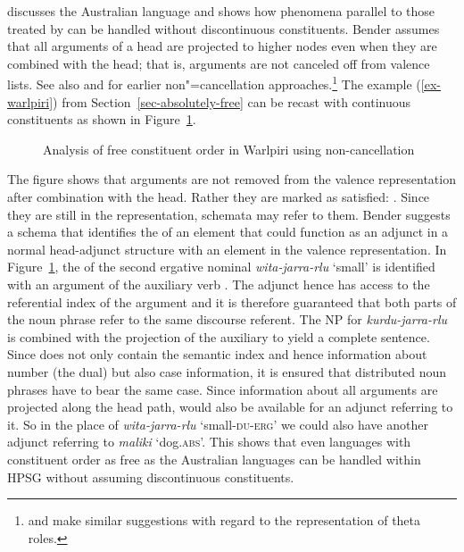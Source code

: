 \documentclass[output=paper
	        ,collection
	        ,collectionchapter
 	        ,biblatex
                ,babelshorthands
                ,newtxmath
                ,draftmode
                ,colorlinks, citecolor=brown
]{langscibook}
\begin{document}
\citet{Bender2008a} discusses the Australian language  and shows how phenomena parallel to
those treated by \citet{DS99a} can be handled without discontinuous constituents.
Bender assumes that all arguments of a head are projected to higher nodes even when they are
combined with the head; that is, arguments are not canceled off from valence lists. See also  and
 for earlier non"=cancellation approaches.\footnote{
 and  make similar suggestions with regard to the
representation of theta roles.%
} The example (\ref{ex-warlpiri}) from
Section~\ref{sec-absolutely-free} can be recast with continuous constituents as shown in
Figure~\ref{fig-warlpiri-non-cancellation}. 
\begin{figure}
\caption{\label{fig-warlpiri-non-cancellation}Analysis of free constituent order in Warlpiri using non-cancellation}
\end{figure}
The figure shows that arguments are not removed from the valence representation after combination
with the head. Rather they are marked as satisfied: . Since they are still in the representation,
schemata may refer to them. Bender suggests a schema that identifies the \modv of an element that
could function as an adjunct in a normal head-adjunct structure with an element in the valence
representation. In Figure~\ref{fig-warlpiri-non-cancellation}, the \modv of the second ergative
nominal \emph{wita-jarra-rlu} `small' is identified with an argument of the auxiliary verb . The
adjunct hence has access to the referential index of the argument and it is therefore guaranteed
that both parts of the noun phrase refer to the same discourse referent. The NP for
\emph{kurdu-jarra-rlu} is combined with the projection of the auxiliary to yield a complete
sentence. Since  does not only contain the semantic index and hence information about number
(the dual) but also case information, it is ensured that distributed noun phrases have to bear the
same case. Since information about all arguments are projected along the head path,  would
also be available for an adjunct referring to it. So in the place of \emph{wita-jarra-rlu}
`small-\textsc{du}-\textsc{erg}' we could also have another adjunct referring to \emph{maliki}
`dog.\textsc{abs}'. This shows that even languages with constituent order as free as the Australian
languages can be handled within HPSG without assuming discontinuous constituents.
\end{document}
